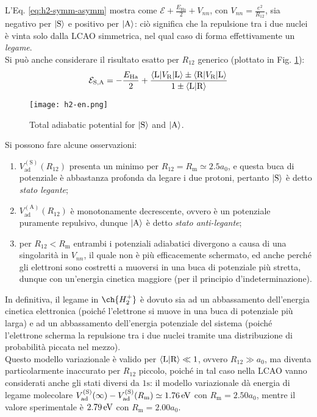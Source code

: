 L'Eq. \ref{eq:h2-symm-asymm} mostra come $ \mathcal{E} + \frac{E_\text{Ha}}{2} + V_{nn} $, con $ V_{nn} = \frac{e^2}{R_{12}} $, sia negativo per $ \ket{\text{S}} $ e positivo per $ \ket{\text{A}} $: ciò significa che la repulsione tra i due nuclei è vinta solo dalla LCAO simmetrica, nel qual caso di forma effettivamente un \textit{legame}. \\
Si può anche considerare il risultato esatto per $ R_{12} $ generico (plottato in Fig. \ref{h2-en}):
\begin{equation}
	\mathcal{E}_{\text{S},\text{A}} = - \frac{E_\text{Ha}}{2} + \frac{\braket{\text{L} | V_\text{R} | \text{L}} \pm \braket{\text{R} | V_\text{R} | \text{L}}}{1 \pm \braket{\text{L} | \text{R}}}
\end{equation}

\begin{figure}[!b]
	\centering
	\texttt{[image: h2-en.png]}
	\caption{Total adiabatic potential for $ \ket{\text{S}} $ and $ \ket{\text{A}} $.}
	\label{h2-en}
\end{figure}

Si possono fare alcune osservazioni:
\begin{enumerate}
	\item $ V_\text{ad}^{(\text{S})}(R_{12}) $ presenta un minimo per $ R_{12} = R_\text{m} \simeq 2.5 a_0 $, e questa buca di potenziale è abbastanza profonda da legare i due protoni, pertanto $ \ket{\text{S}} $ è detto \textit{stato legante};
	\item $ V_\text{ad}^{(\text{A})}(R_{12}) $ è monotonamente decrescente, ovvero è un potenziale puramente repulsivo, dunque $ \ket{\text{A}} $ è detto \textit{stato anti-legante};
	\item per $ R_{12} < R_\text{m} $ entrambi i potenziali adiabatici divergono a causa di una singolarità in $ V_{nn} $, il quale non è più efficacemente schermato, ed anche perché gli elettroni sono costretti a muoversi in una buca di potenziale più stretta, dunque con un'energia cinetica maggiore (per il principio d'indeterminazione).
\end{enumerate}
In definitiva, il legame in $ \ch{H_2^+} $ è dovuto sia ad un abbassamento dell'energia cinetica elettronica (poiché l'elettrone si muove in una buca di potenziale più larga) e ad un abbassamento dell'energia potenziale del sistema (poiché l'elettrone scherma la repulsione tra i due nuclei tramite una distribuzione di probabilità piccata nel mezzo). \\
Questo modello variazionale è valido per $ \braket{\text{L} | \text{R}} \ll 1 $, ovvero $ R_{12} \gg a_0 $, ma diventa particolarmente inaccurato per $ R_{12} $ piccolo, poiché in tal caso nella LCAO vanno considerati anche gli stati diversi da $ \text{1s} $: il modello variazionale dà energia di legame molecolare $ V_\text{ad}^{(\text{S})}(\infty) - V_\text{ad}^{(\text{S})}(R_\text{m}) \simeq 1.76\,\mathrm{eV} $ con $ R_\text{m} = 2.50 a_0 $, mentre il valore sperimentale è $ 2.79\,\mathrm{eV} $ con $ R_\text{m} = 2.00 a_0 $.

